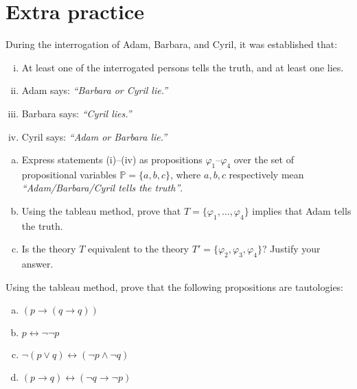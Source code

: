         
\section*{Extra practice}


\begin{problem}

    During the interrogation of Adam, Barbara, and Cyril, it was established that:
    \begin{enumerate}[(i)]\it
        \item At least one of the interrogated persons tells the truth, and at least one lies.
        \item Adam says: \emph{``Barbara or Cyril lie.''}
        \item Barbara says: \emph{``Cyril lies.''}
        \item Cyril says: \emph{``Adam or Barbara lie.''}
    \end{enumerate}
    \begin{enumerate}[(a)]
        \item Express statements (i)–(iv) as propositions $\varphi_1$–$\varphi_4$ over the set of propositional variables $\mathbb{P}=\{a,b,c\}$, where $a,b,c$ respectively mean {\it ``Adam/Barbara/Cyril tells the truth''}.
        \item Using the tableau method, prove that $T = \{\varphi_1, \dots, \varphi_4\}$ implies that Adam tells the truth.
        \item Is the theory $T$ equivalent to the theory $T' = \{\varphi_2, \varphi_3, \varphi_4\}$? Justify your answer.    
    \end{enumerate}
    
\end{problem}
        

\begin{problem}

    Using the tableau method, prove that the following propositions are tautologies:
    \begin{enumerate}[(a)]
        \item $(p\to (q \to q))$
        \item $p \leftrightarrow \neg \neg  p$
        \item $\neg (p \vee q) \leftrightarrow (\neg p \wedge \neg q)$
        \item $(p \to q) \leftrightarrow (\neg q \to \neg p)$    
    \end{enumerate}

\end{problem} 
   

